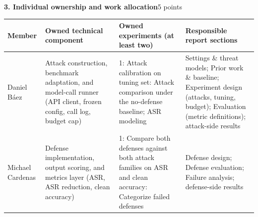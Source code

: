 \documentclass{article}
\newcommand{\block}[2]{\par\vspace{2pt}\noindent\textbf{#1}\hfill #2\par\vspace{1pt}}
\begin{document}
\block{3. Individual ownership and work allocation}{5 points}
\begingroup
\small
\setlength{\tabcolsep}{4pt}
\renewcommand{\arraystretch}{1.05}
\begin{tabularx}{\textwidth}{|>{\raggedright\arraybackslash}p{1.10in}|>{\raggedright\arraybackslash}p{1.02in}|Y|>{\raggedright\arraybackslash}p{1.03in}|}\hline
\textbf{Member} & \textbf{Owned technical component} & \textbf{Owned experiments (at least two)} & \textbf{Responsible report sections} \\ \hline
Daniel Báez & Attack construction, benchmark adaptation, and model-call runner (API client, frozen config, call log, budget cap) & 1: Attack calibration on tuning set: Attack comparison under the no-defense baseline; ASR modeling & Settings \& threat models; Prior work \& baseline; Experiment design (attacks, tuning, budget); Evaluation (metric definitions); attack-side results \\ \hline
Michael Cardenas & Defense implementation, output scoring, and metrics layer (ASR, ASR reduction, clean accuracy) & 1: Compare both defenses against both attack families on ASR and clean accuracy: Categorize failed defenses & Defense design; Defense evaluation; Failure analysis; defense-side results \\ \hline
\end{tabularx}
\endgroup
\end{document}
